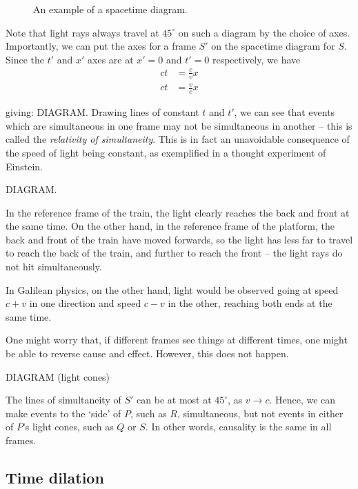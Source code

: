 \documentclass{../template/note}
\begin{document}
    \begin{figure}[ht]
        \centering
        \caption{An example of a spacetime diagram.}
        \label{fig:spacetime-diagram}
    \end{figure}
    
    Note that light rays always travel at \(45^{\circ}\) on such a diagram by the choice of axes. Importantly, we can put the axes for a frame \(S'\) on the spacetime diagram for \(S\). Since the \(t'\) and \(x'\) axes are at \(x'=0\) and \(t'=0\) respectively, we have
    \begin{align*}
        ct &= \frac c v x \\
        ct &= \frac v c x
    \end{align*}


    giving:
    DIAGRAM.
    Drawing lines of constant \(t\) and \(t'\), we can see that events which are simultaneous in one frame may not be simultaneous in another -- this is called the \emph{relativity of simultaneity}. This is in fact an unavoidable consequence of the speed of light being constant, as exemplified in a thought experiment of Einstein.

    DIAGRAM.

    In the reference frame of the train, the light clearly reaches the back and front at the same time. On the other hand, in the reference frame of the platform, the back and front of the train have moved forwards, so the light has less far to travel to reach the back of the train, and further to reach the front -- the light rays do not hit simultaneously.
    
    In Galilean physics, on the other hand, light would be observed going at speed \(c+v\) in one direction and speed \(c-v\) in the other, reaching both ends at the same time.

    One might worry that, if different frames see things at different times, one might be able to reverse cause and effect. However, this does not happen.

    DIAGRAM (light cones)

    The lines of simultaneity of \(S'\) can be at most at \(45^\circ\), as \(v \to c\). Hence, we can make events to the `side' of \(P\), such as \(R\), simultaneous, but not events in either of \(P\)'s light cones, such as \(Q\) or \(S\). In other words, causality is the same in all frames.

    \subsection{Time dilation}
\end{document}
